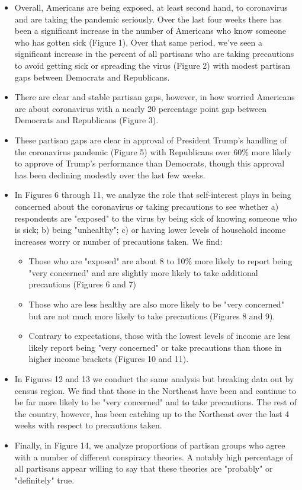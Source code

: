 \documentclass[landscape]{article}
\begin{document}
\begin{itemize}
	\item Overall, Americans are being exposed, at least second hand, to coronavirus and are taking the pandemic seriously. Over the last four weeks there has been a significant increase in the number of Americans who know someone who has gotten sick (Figure 1). Over that same period, we've seen a significant increase in the percent of all partisans who are taking precautions to avoid getting sick or spreading the virus (Figure 2) with modest partisan gaps between Democrats and Republicans.
	\item There are clear and stable partisan gaps, however, in how worried Americans are about coronavirus with a nearly 20 percentage point gap between Democrats and Republicans (Figure 3). 
	\item These partisan gaps are clear in approval of President Trump's handling of the coronavirus pandemic (Figure 5) with Republicans over 60\% more likely to approve of Trump's performance than Democrats, though this approval has been declining modestly over the last few weeks.
	\item In Figures 6 through 11, we analyze the role that self-interest plays in being concerned about the coronavirus or taking precautions to see whether a) respondents are "exposed" to the virus by being sick of knowing someone who is sick; b) being "unhealthy"; c) or having lower levels of household income increases worry or number of precautions taken. We find:
	\begin{itemize}
		\item Those who are "exposed" are about 8 to 10\% more likely to report being "very concerned" and are slightly more likely to take additional precautions (Figures 6 and 7)
		\item Those who are less healthy are also more likely to be "very concerned" but are not much more likely to take precautions (Figures 8 and 9).
		\item Contrary to expectations, those with the lowest levels of income are less likely report being "very concerned" or take precautions than those in higher income brackets (Figures 10 and 11).
	\end{itemize} 
	\item In Figures 12 and 13 we conduct the same analysis but breaking data out by census region. We find that those in the Northeast have been and continue to be far more likely to be "very concerned" and to take precautions. The rest of the country, however, has been catching up to the Northeast over the last 4 weeks with respect to precautions taken. 
	\item Finally, in Figure 14, we analyze proportions of partisan groups who agree with a number of different conspiracy theories. A notably high percentage of all partisans appear willing to say that these theories are "probably" or "definitely" true.
\end{itemize}
\end{document}
